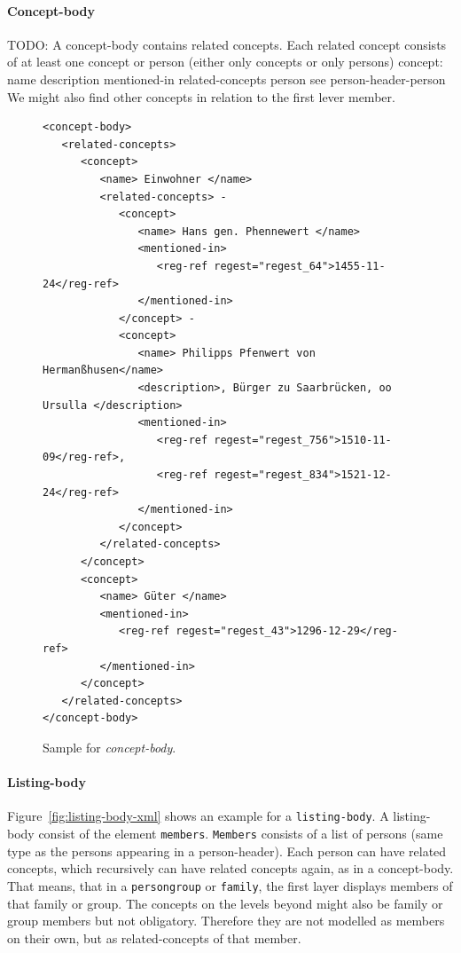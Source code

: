 \paragraph{Concept-body}
TODO: A concept-body contains related concepts. Each related concept consists of at least one concept or person (either only concepts or only persons)
concept:
name
description
mentioned-in
related-concepts
person
see person-header-person
We might also find other concepts in relation to the first lever member.
\begin{figure}[H]
\centering
\begin{verbatim}
<concept-body>
   <related-concepts>
      <concept>
         <name> Einwohner </name>
         <related-concepts> -
            <concept>
               <name> Hans gen. Phennewert </name>
               <mentioned-in>
                  <reg-ref regest="regest_64">1455-11-24</reg-ref>
               </mentioned-in>
            </concept> -
            <concept>
               <name> Philipps Pfenwert von Hermanßhusen</name>
               <description>, Bürger zu Saarbrücken, oo Ursulla </description>
               <mentioned-in>
                  <reg-ref regest="regest_756">1510-11-09</reg-ref>, 
                  <reg-ref regest="regest_834">1521-12-24</reg-ref>
               </mentioned-in>
            </concept>
         </related-concepts>
      </concept>
      <concept>
         <name> Güter </name>
         <mentioned-in>
            <reg-ref regest="regest_43">1296-12-29</reg-ref>
         </mentioned-in>
      </concept>
   </related-concepts>
</concept-body>
\end{verbatim}
\label{fig:concept-body-xml}
\caption{Sample for \textit{concept-body}.}
\end{figure}

\paragraph{Listing-body}
Figure~\ref{fig:listing-body-xml} shows an example for a \texttt{listing-body}. A listing-body consist of the element \texttt{members}. \texttt{Members} consists of a list of persons (same type as the persons appearing in a person-header). Each person can have related concepts, which recursively can have related concepts again, as in a concept-body.
That means, that in a \texttt{persongroup} or \texttt{family}, the first layer displays members of that family or group. The concepts on the levels beyond might also be family or group members but not obligatory. Therefore they are not modelled as members on their own, but as related-concepts of that member.

